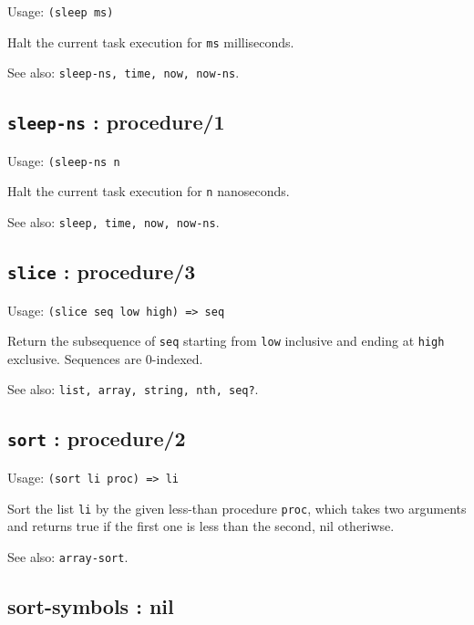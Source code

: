 \documentclass[
]{article}
\newcommand{\passthrough}[1]{#1}
\begin{document}
Usage: \passthrough{\lstinline!(sleep ms)!}

Halt the current task execution for \passthrough{\lstinline!ms!}
milliseconds.

See also: \passthrough{\lstinline!sleep-ns, time, now, now-ns!}.

\hypertarget{sleep-ns-procedure1-1}{%
\subsection{\texorpdfstring{\texttt{sleep-ns} :
procedure/1}{sleep-ns : procedure/1}}\label{sleep-ns-procedure1-1}}

Usage: \passthrough{\lstinline!(sleep-ns n!}

Halt the current task execution for \passthrough{\lstinline!n!}
nanoseconds.

See also: \passthrough{\lstinline!sleep, time, now, now-ns!}.

\hypertarget{slice-procedure3-1}{%
\subsection{\texorpdfstring{\texttt{slice} :
procedure/3}{slice : procedure/3}}\label{slice-procedure3-1}}

Usage: \passthrough{\lstinline!(slice seq low high) => seq!}

Return the subsequence of \passthrough{\lstinline!seq!} starting from
\passthrough{\lstinline!low!} inclusive and ending at
\passthrough{\lstinline!high!} exclusive. Sequences are 0-indexed.

See also: \passthrough{\lstinline!list, array, string, nth, seq?!}.

\hypertarget{sort-procedure2-1}{%
\subsection{\texorpdfstring{\texttt{sort} :
procedure/2}{sort : procedure/2}}\label{sort-procedure2-1}}

Usage: \passthrough{\lstinline!(sort li proc) => li!}

Sort the list \passthrough{\lstinline!li!} by the given less-than
procedure \passthrough{\lstinline!proc!}, which takes two arguments and
returns true if the first one is less than the second, nil otheriwse.

See also: \passthrough{\lstinline!array-sort!}.

\hypertarget{sort-symbols-nil-1}{%
\subsection{sort-symbols : nil}\label{sort-symbols-nil-1}}
\end{document}
